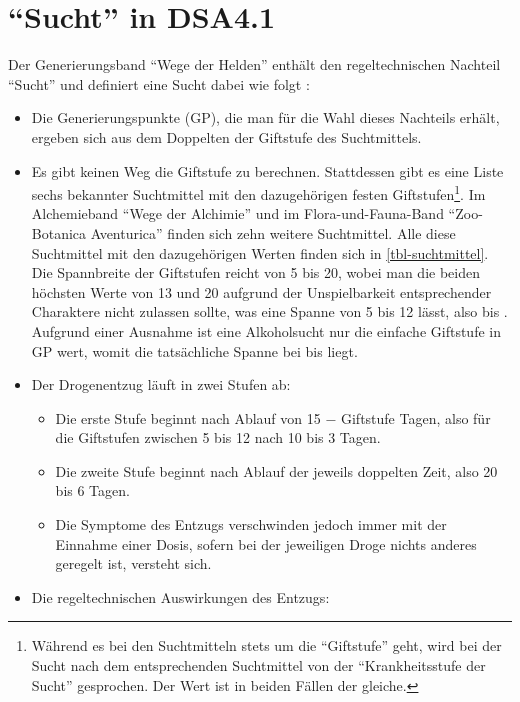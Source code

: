 \section{\enquote{Sucht} in DSA4.1}
Der Generierungsband \enquote{Wege der Helden} \cite{WdH} enthält den regeltechnischen Nachteil \enquote{Sucht} und definiert eine Sucht dabei wie folgt \cite[S.~271]{WdH}:

\begin{itemize}
	\item Die Generierungspunkte (GP), die man für die Wahl dieses Nachteils erhält, ergeben sich aus dem Doppelten der Giftstufe des Suchtmittels.
	\item Es gibt keinen Weg die Giftstufe zu berechnen. Stattdessen gibt es eine Liste sechs bekannter Suchtmittel mit den dazugehörigen festen Giftstufen\footnote{Während es bei den Suchtmitteln stets um die \enquote{Giftstufe} geht, wird bei der Sucht nach dem entsprechenden Suchtmittel von der \enquote{Krankheitsstufe der Sucht} gesprochen. Der Wert ist in beiden Fällen der gleiche.}. Im Alchemieband \enquote{Wege der Alchimie} \cite{WdA} und im Flora-und-Fauna-Band \enquote{Zoo-Botanica Aventurica} \cite{ZBA} finden sich zehn weitere Suchtmittel. Alle diese Suchtmittel mit den dazugehörigen Werten finden sich in \vref{tbl-suchtmittel}. Die Spannbreite der Giftstufen reicht von 5 bis 20, wobei man die beiden höchsten Werte von 13 und 20 aufgrund der Unspielbarkeit entsprechender Charaktere nicht zulassen sollte, was eine Spanne von 5 bis 12 lässt, also  bis . Aufgrund einer Ausnahme ist eine Alkoholsucht nur die einfache Giftstufe in GP wert, womit die tatsächliche Spanne bei  bis  liegt.
	\item Der Drogenentzug läuft in zwei Stufen ab:
		\begin{itemize}
			\item Die erste Stufe beginnt nach Ablauf von 15 − Giftstufe Tagen, also für die Giftstufen zwischen 5 bis 12 nach 10 bis 3 Tagen.
			\item Die zweite Stufe beginnt nach Ablauf der jeweils doppelten Zeit, also 20 bis 6 Tagen.
			\item Die Symptome des Entzugs verschwinden jedoch immer mit der Einnahme einer Dosis, sofern bei der jeweiligen Droge nichts anderes geregelt ist, versteht sich.
		\end{itemize}
	\item Die regeltechnischen Auswirkungen des Entzugs:
		\begin{itemize}

\end{itemize}
\end{itemize}
